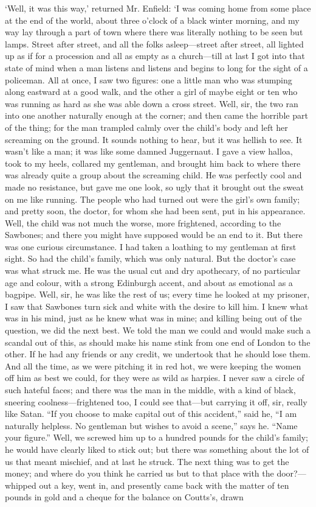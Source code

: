 \documentclass[]{novel}
\begin{document}
‘Well, it was this way,’ returned Mr. Enfield: ‘I was coming home from some place at the end of the world, about three o’clock of a black winter morning, and my way lay through a part of town where there was literally nothing to be seen but lamps. Street after street, and all the folks asleep—street after street, all lighted up as if for a procession and all as empty as a church—till at last I got into that state of mind when a man listens and listens and begins to long for the sight of a policeman. All at once, I saw two figures: one a little man who was stumping along eastward at a good walk, and the other a girl of maybe eight or ten who was running as hard as she was able down a cross street. Well, sir, the two ran into one another naturally enough at the corner; and then came the horrible part of the thing; for the man trampled calmly over the child’s body and left her screaming on the ground. It sounds nothing to hear, but it was hellish to see. It wasn’t like a man; it was like some damned Juggernaut. I gave a view halloa, took to my heels, collared my gentleman, and brought him back to where there was already quite a group about the screaming child. He was perfectly cool and made no resistance, but gave me one look, so ugly that it brought out the sweat on me like running. The people who had turned out were the girl’s own family; and pretty soon, the doctor, for whom she had been sent, put in his appearance. Well, the child was not much the worse, more frightened, according to the Sawbones; and there you might have supposed would be an end to it. But there was one curious circumstance. I had taken a loathing to my gentleman at first sight. So had the child’s family, which was only natural. But the doctor’s case was what struck me. He was the usual cut and dry apothecary, of no particular age and colour, with a strong Edinburgh accent, and about as emotional as a bagpipe. Well, sir, he was like the rest of us; every time he looked at my prisoner, I saw that Sawbones turn sick and white with the desire to kill him. I knew what was in his mind, just as he knew what was in mine; and killing being out of the question, we did the next best. We told the man we could and would make such a scandal out of this, as should make his name stink from one end of London to the other. If he had any friends or any credit, we undertook that he should lose them. And all the time, as we were pitching it in red hot, we were keeping the women off him as best we could, for they were as wild as harpies. I never saw a circle of such hateful faces; and there was the man in the middle, with a kind of black, sneering coolness—frightened too, I could see that—but carrying it off, sir, really like Satan. “If you choose to make capital out of this accident,” said he, “I am naturally helpless. No gentleman but wishes to avoid a scene,” says he. “Name your figure.” Well, we screwed him up to a hundred pounds for the child’s family; he would have clearly liked to stick out; but there was something about the lot of us that meant mischief, and at last he struck. The next thing was to get the money; and where do you think he carried us but to that place with the door?—whipped out a key, went in, and presently came back with the matter of ten pounds in gold and a cheque for the balance on Coutts’s, drawn 
\end{document}
